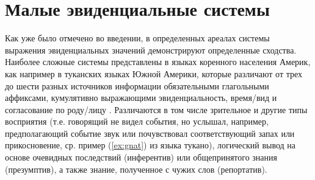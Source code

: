 \section{Малые эвиденциальные системы} \label{sec:small}

Как уже было отмечено во введении, в определенных ареалах системы выражения эвиденциальных значений демонстрируют определенные сходства. Наиболее сложные системы представлены в языках коренного населения Америк, как например в туканских языках Южной Америки, которые различают от трех до шести разных источников информации обязательными глагольными аффиксами, кумулятивно выражающими эвиденциальность, время/вид и согласование по роду/лицу \citep{stenzelgomez2018}. Различаются в том числе зрительное и другие типы восприятия (т.е. говорящий не видел события, но услышал, например, предполагающий событие звук или почувствовал соответствующий запах или прикосновение, ср. пример (\ref{ex:gnat}) из языка тукано), логический вывод на основе очевидных последствий (инферентив) или общепринятого знания (презумптив), а также знание, полученное с чужих слов (репортатив).


